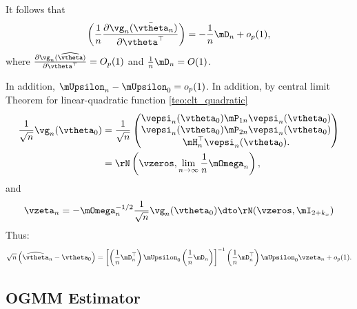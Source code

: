 It follows that 
  \begin{equation*}
  \left(\frac{1}{n}\frac{\partial \vg_n(\bar{\vtheta}_n)}{\partial \vtheta^\top}\right) = -\frac{1}{n}\mD_n + o_p(1),
  \end{equation*}
  where $\frac{\partial \vg_n(\widehat{\vtheta})}{\partial \vtheta^\top} = O_p(1)$ and $\frac{1}{n}\mD_n = O(1)$. 
  
  In addition, $\mUpsilon_n - \mUpsilon_0 = o_p(1)$. In addition, by central limit Theorem for linear-quadratic function \ref{teo:clt_quadratic}
  \begin{equation*}
    \begin{aligned}
      \frac{1}{\sqrt{n}}\vg_n(\vtheta_0) & = \frac{1}{\sqrt{n}}
                                              \begin{pmatrix}
                                               \vepsi_n(\vtheta_0)\mP_{1n}\vepsi_n(\vtheta_0)\\
                                               \vepsi_n(\vtheta_0)\mP_{2n}\vepsi_n(\vtheta_0)\\
                                               \mH_n^\top\vepsi_n(\vtheta_0).
                                              \end{pmatrix} \\
                                        & = \rN\left(\vzeros, \lim_{n\to\infty}\frac{1}{n}\mOmega_n\right),
                                        \end{aligned}
  \end{equation*}
  and
  \begin{equation*}
    \begin{aligned}
      \vzeta_n = -\mOmega_n^{-1/2}\frac{1}{\sqrt{n}}\vg_n(\vtheta_0)\dto \rN(\vzeros, \mI_{2+k_x})
    \end{aligned}
      \end{equation*}
    Thus:
    \begin{equation*}
      \sqrt{n}\left(\widehat{\vtheta}_n - \vtheta_0\right) = \left[\left(\frac{1}{n}\mD_n^\top\right)\mUpsilon_0\left(\frac{1}{n}\mD_n\right)\right]^{-1}\left(\frac{1}{n}\mD_n^\top\right)\mUpsilon_0\vzeta_n + o_p(1).
    \end{equation*}


\subsection{OGMM Estimator}

